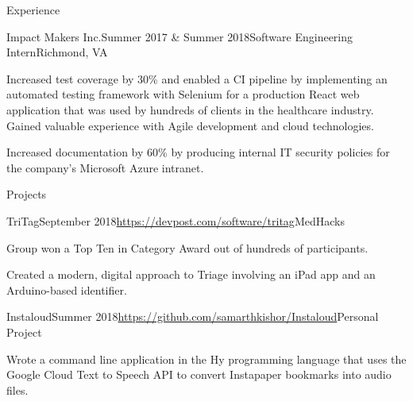 \documentclass{resume}
\begin{document}
\begin{rSection}{Experience}
  \begin{rSubsection}{Impact Makers Inc.}{Summer 2017 \& Summer 2018}{Software Engineering Intern}{Richmond, VA}
    \item Increased test coverage by 30\% and enabled a CI pipeline by implementing an automated testing framework with Selenium for a production React web application that was used by hundreds of clients in the healthcare industry.  Gained valuable experience with Agile development and cloud technologies.
    \item Increased documentation by 60\% by producing internal IT security policies for the company's Microsoft Azure intranet.
  \end{rSubsection}

\end{rSection}

\begin{rSection}{Projects}

  \begin{rSubsection}{TriTag}{September 2018}{\url{https://devpost.com/software/tritag}}{MedHacks}
    \item Group won a Top Ten in Category Award out of hundreds of participants.
    \item Created a modern, digital approach to Triage involving an iPad app and an Arduino-based identifier.
  \end{rSubsection}

  \begin{rSubsection}{Instaloud}{Summer 2018}{\url{https://github.com/samarthkishor/Instaloud}}{Personal Project}
    \item Wrote a command line application in the Hy programming language that uses the Google Cloud Text to Speech API to convert Instapaper bookmarks into audio files.
  \end{rSubsection}

\end{rSection}
\end{document}
